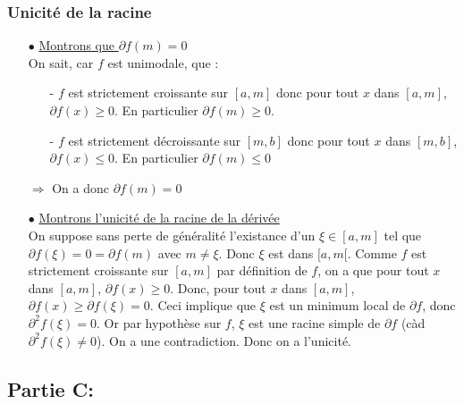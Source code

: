 \documentclass[a4paper, 12pt]{article}
\begin{document}
\subsubsection{Unicité de la racine}

\begin{itemize}
	\item[$\bullet$] \underline{Montrons que $\partial f(m) =0 $} \\
		On sait, car $f$ est unimodale, que :
		\begin{itemize}
			\item[-] $f$ est strictement croissante sur $[a,m]$ donc pour tout $x$ dans $[a,m]$, $\partial f(x) \geqslant 0$. En particulier $\partial f(m) \geqslant 0$.
			\item[-] $f$ est strictement décroissante sur $[m,b]$ donc pour tout $x$ dans $[m,b]$, $\partial f(x) \leqslant 0 $. En particulier $\partial f(m) \leqslant 0$
		\end{itemize}
		$\Rightarrow$ On a donc $\partial f(m) = 0$
	\item[$\bullet$] \underline{Montrons l'unicité de la racine de la dérivée} \\
		On suppose sans perte de généralité l'existance d'un $\xi \in [a,m]$ tel que $ \partial f(\xi) = 0 = \partial f(m)$ avec $ m \neq \xi$. Donc $\xi$ est dans $[a,m[$. Comme $f$ est strictement croissante sur $[a,m]$ par définition de $f$, on a que pour tout $x$ dans $[a,m]$, $\partial f(x) \geqslant 0$. Donc, pour tout $x$ dans $[a,m]$, $\partial f(x) \geqslant \partial f(\xi) = 0$. Ceci implique que $\xi$ est un minimum local de $\partial f$, donc $\partial^2 f(\xi) = 0$. Or par hypothèse sur $f$, $\xi$ est une racine simple de $\partial f$ (càd $\partial^2 f(\xi) \neq 0$). On a une contradiction. Donc on a l'unicité.
\end{itemize}


\newpage

\subsection{Partie C:}
\end{document}
